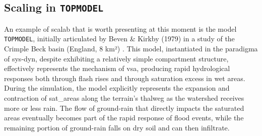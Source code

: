 \documentclass[./main_en.tex]{subfiles}
\begin{document}
\subsection{Scaling in \texttt{TOPMODEL}} \label{sec:hydro:topmodel}

\par An example of \gls{scalab} that is worth presenting at this moment is the \gls{model} \texttt{TOPMODEL}, initially articulated by Beven \& Kirkby (1979) in a study of the Crimple Beck basin (England, 8 km²) \cite{Beven1979a}. This \gls{model}, instantiated in the \gls{paradigma} of \gls{sys-dyn}, despite exhibiting a relatively simple compartment structure, effectively represents the mechanism of \gls{vsa}, producing rapid hydrological responses both through flash rises and through saturation excess in wet areas. During the simulation, the \gls{model} explicitly represents the expansion and contraction of \gls{sat_areas} along the terrain's thalweg as the watershed receives more or less rain. The flow of \gls{ground-rain} that directly impacts the saturated areas eventually becomes part of the rapid response of flood events, while the remaining portion of \gls{ground-rain} falls on dry soil and can then infiltrate.
\end{document}
